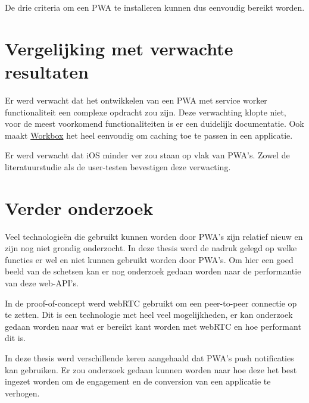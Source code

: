 		De drie criteria om een PWA te installeren kunnen dus eenvoudig bereikt worden.
		
	
	
\section{Vergelijking met verwachte resultaten}
	Er werd verwacht dat het ontwikkelen van een PWA met service worker functionaliteit een complexe opdracht zou zijn.
	Deze verwachting klopte niet, voor de meest voorkomend functionaliteiten is er een duidelijk documentatie. Ook maakt \href{https://developers.google.com/web/tools/workbox}{Workbox} het heel eenvoudig om caching toe te passen in een applicatie.
	
	Er werd verwacht dat iOS minder ver zou staan op vlak van PWA's. Zowel de literatuurstudie als de user-testen bevestigen deze verwacting.
	

\section{Verder onderzoek}
	Veel technologieën die gebruikt kunnen worden door PWA's zijn relatief nieuw en zijn nog niet grondig onderzocht.
	In deze thesis werd de nadruk gelegd op welke functies er wel en niet kunnen gebruikt worden door PWA's. Om hier een goed beeld van de schetsen kan er nog onderzoek gedaan worden naar de performantie van deze web-API's.
	
	In de proof-of-concept werd webRTC gebruikt om een peer-to-peer connectie op te zetten. Dit is een technologie met heel veel mogelijkheden, er kan onderzoek gedaan worden naar wat er bereikt kant worden met webRTC en hoe performant dit is.
	
	In deze thesis werd verschillende keren aangehaald dat PWA's push notificaties kan gebruiken. Er zou onderzoek gedaan kunnen worden naar hoe deze het best ingezet worden om de engagement en de conversion van een applicatie te verhogen.